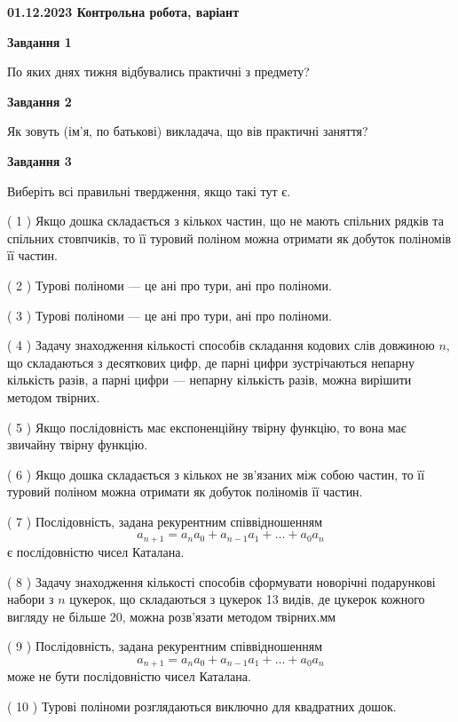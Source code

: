 \documentclass[12pt, ukrainian]{article}
\begin{document}
\begin {large}

\textbf{01.12.2023 Контрольна робота, варіант  }\par


{
{\begin {center}\textbf{Завдання 1}\end {center}}\par
По яких днях тижня відбувались практичні з предмету?\par
{\begin {center}\textbf{Завдання 2}\end {center}}\par
Як зовуть (ім'я, по батькові) викладача, що вів практичні заняття?\par
{\begin {center}\textbf{Завдання 3}\end {center}}\par
Виберіть всі правильні твердження, якщо такі тут є.\par
\vspace{2mm}
( 1 ) Якщо дошка складається з кількох частин, що не мають спільних рядків та спільних стовпчиків, то її туровий поліном можна отримати як добуток поліномів її частин.%

( 2 ) Турові поліноми --- це ані про тури, ані про поліноми.%

( 3 ) Турові поліноми --- це ані про тури, ані про поліноми.%

( 4 ) Задачу знаходження кількості способів складання кодових слів довжиною $n$, що складаються з десяткових цифр, де парні цифри зустрічаються непарну кількість разів, а парні цифри — непарну кількість разів, можна вирішити методом твірних.%

( 5 ) Якщо послідовність має експоненційну твірну функцію, то вона має звичайну твірну функцію.%

( 6 ) Якщо дошка складається з кількох не зв’язаних між собою частин, то її туровий поліном можна отримати як добуток поліномів її частин.%

( 7 ) Послідовність, задана рекурентним співвідношенням $$a_{n+1}=a_{n}a_{0}+a_{n-1}a_{1}+\ldots+a_0a_{n}$$ є послідовністю чисел Каталана.%

( 8 ) Задачу знаходження кількості способів сформувати новорічні подарункові набори з $n$ цукерок, що складаються з цукерок 13 видів, де цукерок кожного вигляду не більше 20, можна розв’язати методом твірних.мм%

( 9 ) Послідовність, задана рекурентним співвідношенням $$a_{n+1}=a_{n}a_{0}+a_{n-1}a_{1}+\ldots+a_0a_{n}$$ може не бути послідовністю чисел Каталана.%

( 10 ) Турові поліноми розглядаються виключно для квадратних дошок.%
}
\end {large}

\vspace{4mm}
\newpage
\end{document}
